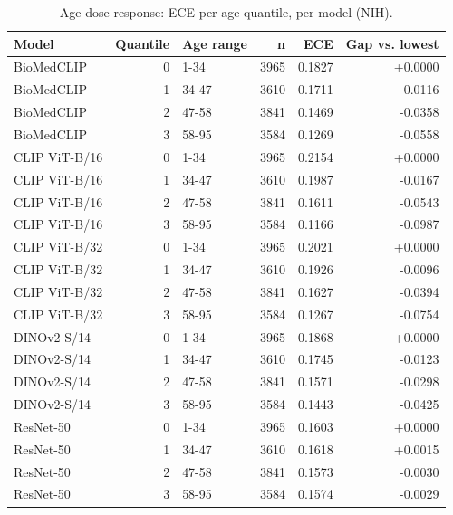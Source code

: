 \begin{table}[t]
  \centering
  \small
  \caption{Age dose-response: ECE per age quantile, per model (NIH).}
  \label{tab:dose}
  \begin{tabular}{lrlrrr}
    \toprule
    \textbf{Model} & \textbf{Quantile} & \textbf{Age range} & \textbf{n} & \textbf{ECE} & \textbf{Gap vs. lowest} \\
    \midrule
    BioMedCLIP & 0 & 1-34 & 3965 & 0.1827 & +0.0000 \\
    BioMedCLIP & 1 & 34-47 & 3610 & 0.1711 & -0.0116 \\
    BioMedCLIP & 2 & 47-58 & 3841 & 0.1469 & -0.0358 \\
    BioMedCLIP & 3 & 58-95 & 3584 & 0.1269 & -0.0558 \\
    \addlinespace[2pt]
    CLIP ViT-B/16 & 0 & 1-34 & 3965 & 0.2154 & +0.0000 \\
    CLIP ViT-B/16 & 1 & 34-47 & 3610 & 0.1987 & -0.0167 \\
    CLIP ViT-B/16 & 2 & 47-58 & 3841 & 0.1611 & -0.0543 \\
    CLIP ViT-B/16 & 3 & 58-95 & 3584 & 0.1166 & -0.0987 \\
    \addlinespace[2pt]
    CLIP ViT-B/32 & 0 & 1-34 & 3965 & 0.2021 & +0.0000 \\
    CLIP ViT-B/32 & 1 & 34-47 & 3610 & 0.1926 & -0.0096 \\
    CLIP ViT-B/32 & 2 & 47-58 & 3841 & 0.1627 & -0.0394 \\
    CLIP ViT-B/32 & 3 & 58-95 & 3584 & 0.1267 & -0.0754 \\
    \addlinespace[2pt]
    DINOv2-S/14 & 0 & 1-34 & 3965 & 0.1868 & +0.0000 \\
    DINOv2-S/14 & 1 & 34-47 & 3610 & 0.1745 & -0.0123 \\
    DINOv2-S/14 & 2 & 47-58 & 3841 & 0.1571 & -0.0298 \\
    DINOv2-S/14 & 3 & 58-95 & 3584 & 0.1443 & -0.0425 \\
    \addlinespace[2pt]
    ResNet-50 & 0 & 1-34 & 3965 & 0.1603 & +0.0000 \\
    ResNet-50 & 1 & 34-47 & 3610 & 0.1618 & +0.0015 \\
    ResNet-50 & 2 & 47-58 & 3841 & 0.1573 & -0.0030 \\
    ResNet-50 & 3 & 58-95 & 3584 & 0.1574 & -0.0029 \\
    \bottomrule
  \end{tabular}
\end{table}